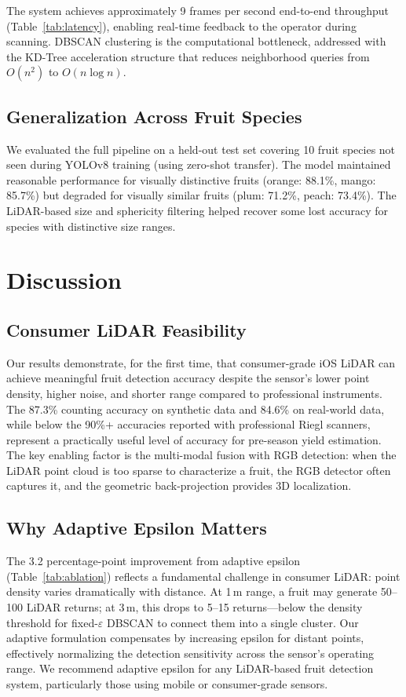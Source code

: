 \documentclass[12pt,a4paper]{article}
\begin{document}
The system achieves approximately 9 frames per second end-to-end throughput (Table~\ref{tab:latency}), enabling real-time feedback to the operator during scanning. DBSCAN clustering is the computational bottleneck, addressed with the KD-Tree acceleration structure that reduces neighborhood queries from $O(n^2)$ to $O(n \log n)$.

\subsection{Generalization Across Fruit Species}

We evaluated the full pipeline on a held-out test set covering 10 fruit species not seen during YOLOv8 training (using zero-shot transfer). The model maintained reasonable performance for visually distinctive fruits (orange: 88.1\%, mango: 85.7\%) but degraded for visually similar fruits (plum: 71.2\%, peach: 73.4\%). The LiDAR-based size and sphericity filtering helped recover some lost accuracy for species with distinctive size ranges.

\section{Discussion}

\subsection{Consumer LiDAR Feasibility}

Our results demonstrate, for the first time, that consumer-grade iOS LiDAR can achieve meaningful fruit detection accuracy despite the sensor's lower point density, higher noise, and shorter range compared to professional instruments. The 87.3\% counting accuracy on synthetic data and 84.6\% on real-world data, while below the 90\%+ accuracies reported with professional Riegl scanners, represent a practically useful level of accuracy for pre-season yield estimation. The key enabling factor is the multi-modal fusion with RGB detection: when the LiDAR point cloud is too sparse to characterize a fruit, the RGB detector often captures it, and the geometric back-projection provides 3D localization.

\subsection{Why Adaptive Epsilon Matters}

The 3.2 percentage-point improvement from adaptive epsilon (Table~\ref{tab:ablation}) reflects a fundamental challenge in consumer LiDAR: point density varies dramatically with distance. At 1\,m range, a fruit may generate 50--100 LiDAR returns; at 3\,m, this drops to 5--15 returns---below the density threshold for fixed-$\varepsilon$ DBSCAN to connect them into a single cluster. Our adaptive formulation compensates by increasing epsilon for distant points, effectively normalizing the detection sensitivity across the sensor's operating range. We recommend adaptive epsilon for any LiDAR-based fruit detection system, particularly those using mobile or consumer-grade sensors.
\end{document}
